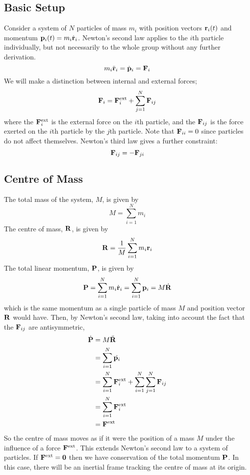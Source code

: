 \subsection{Basic Setup}
Consider a system of \(N\) particles of mass \(m_i\) with position vectors \(\vb r_i(t)\) and momentum \(\vb p_i(t) = m_i \dot {\vb r}_i\).
Newton's second law applies to the \(i\)th particle individually, but not necessarily to the whole group without any further derivation.
\[
	m_i \ddot{\vb{r}}_i = \dot{\vb p}_i = \vb F_i
\]
We will make a distinction between internal and external forces;
\[
	\vb F_i = \vb F_i^\text{ext} + \sum_{j = 1}^N \vb F_{ij}
\]
where the \(\vb F_i^\text{ext}\) is the external force on the \(i\)th particle, and the \(\vb F_{ij}\) is the force exerted on the \(i\)th particle by the \(j\)th particle.
Note that \(\vb F_{ii} = 0\) since particles do not affect themselves.
Newton's third law gives a further constraint:
\[
	\vb F_{ij} = -\vb F_{ji}
\]

\subsection{Centre of Mass}
The total mass of the system, \(M\), is given by
\[
	M = \sum_{i=1}^N m_i
\]
The centre of mass, \(\vb R\), is given by
\[
	\vb R = \frac{1}{M} \sum_{i=1}^N m_i \vb r_i
\]
The total linear momentum, \(\vb P\), is given by
\[
	\vb P = \sum_{i=1}^N m_i \dot{\vb{r}}_i = \sum_{i=1}^N \vb p_i = M\dot{\vb R}
\]
which is the same momentum as a single particle of mass \(M\) and position vector \(\vb R\) would have.
Then, by Newton's second law, taking into account the fact that the \(\vb F_{ij}\) are antisymmetric,
\begin{align*}
	\dot{\vb P} & = M \ddot{\vb R}                                                         \\
	            & = \sum_{i=1}^N \dot{\vb p_i}                                             \\
	            & = \sum_{i=1}^N \vb F_i^\text{ext} + \sum_{i=1}^N \sum_{j=1}^N \vb F_{ij} \\
	            & = \sum_{i=1}^N \vb F_i^\text{ext}                                        \\
	            & = \vb F^\text{ext}
\end{align*}
So the centre of mass moves as if it were the position of a mass \(M\) under the influence of a force \(\vb F^\text{ext}\).
This extends Newton's second law to a system of particles.
If \(\vb F^\text{ext} = \vb 0\) then we have conservation of the total momentum \(\vb P\).
In this case, there will be an inertial frame tracking the centre of mass at its origin.

